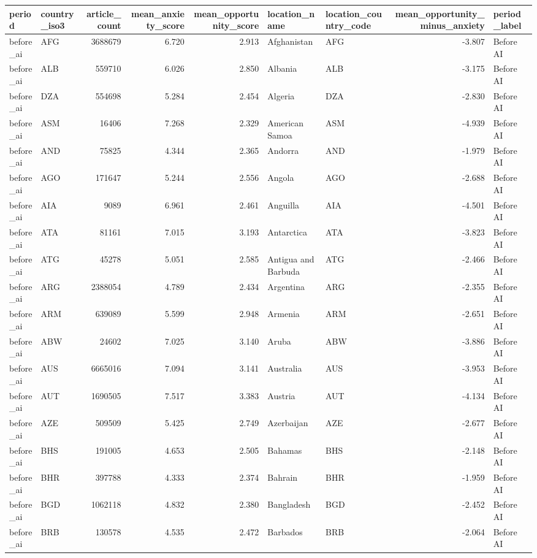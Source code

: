 \begin{tabular}{llrrrllrl}
\toprule
period & country\_iso3 & article\_count & mean\_anxiety\_score & mean\_opportunity\_score & location\_name & location\_country\_code & mean\_opportunity\_minus\_anxiety & period\_label \\
\midrule
before\_ai & AFG & 3688679 & 6.720 & 2.913 & Afghanistan & AFG & -3.807 & Before AI \\
before\_ai & ALB & 559710 & 6.026 & 2.850 & Albania & ALB & -3.175 & Before AI \\
before\_ai & DZA & 554698 & 5.284 & 2.454 & Algeria & DZA & -2.830 & Before AI \\
before\_ai & ASM & 16406 & 7.268 & 2.329 & American Samoa & ASM & -4.939 & Before AI \\
before\_ai & AND & 75825 & 4.344 & 2.365 & Andorra & AND & -1.979 & Before AI \\
before\_ai & AGO & 171647 & 5.244 & 2.556 & Angola & AGO & -2.688 & Before AI \\
before\_ai & AIA & 9089 & 6.961 & 2.461 & Anguilla & AIA & -4.501 & Before AI \\
before\_ai & ATA & 81161 & 7.015 & 3.193 & Antarctica & ATA & -3.823 & Before AI \\
before\_ai & ATG & 45278 & 5.051 & 2.585 & Antigua and Barbuda & ATG & -2.466 & Before AI \\
before\_ai & ARG & 2388054 & 4.789 & 2.434 & Argentina & ARG & -2.355 & Before AI \\
before\_ai & ARM & 639089 & 5.599 & 2.948 & Armenia & ARM & -2.651 & Before AI \\
before\_ai & ABW & 24602 & 7.025 & 3.140 & Aruba & ABW & -3.886 & Before AI \\
before\_ai & AUS & 6665016 & 7.094 & 3.141 & Australia & AUS & -3.953 & Before AI \\
before\_ai & AUT & 1690505 & 7.517 & 3.383 & Austria & AUT & -4.134 & Before AI \\
before\_ai & AZE & 509509 & 5.425 & 2.749 & Azerbaijan & AZE & -2.677 & Before AI \\
before\_ai & BHS & 191005 & 4.653 & 2.505 & Bahamas & BHS & -2.148 & Before AI \\
before\_ai & BHR & 397788 & 4.333 & 2.374 & Bahrain & BHR & -1.959 & Before AI \\
before\_ai & BGD & 1062118 & 4.832 & 2.380 & Bangladesh & BGD & -2.452 & Before AI \\
before\_ai & BRB & 130578 & 4.535 & 2.472 & Barbados & BRB & -2.064 & Before AI \\

\end{tabular}
